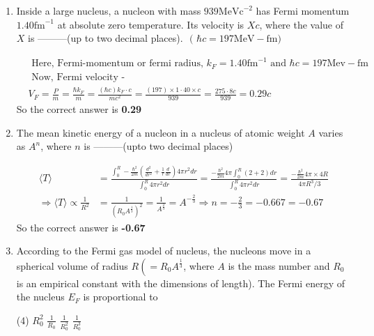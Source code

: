 \begin{enumerate}
	\item  Inside a large nucleus, a nucleon with mass $939 \mathrm{MeVc}^{-2}$ has Fermi momentum $1.40 \mathrm{fm}^{-1}$ at absolute zero temperature. Its velocity is $X c$, where the value of $X$ is ---------(up to two decimal places).
	$
	\text { ( } \hbar c=197 \mathrm{MeV}-\mathrm{fm})
	$
	\begin{answer}
		\begin{align*}
	&\text{ Here, Fermi-momentum or fermi radius, $k_F=1.40 \mathrm{fm}^{-1}$ and $\hbar c=197 \mathrm{Mev}-\mathrm{fm}$ }\\
&\text{	Now, Fermi velocity -}\\
	&	V_F=\frac{P}{m}=\frac{\hbar k_F}{m}=\frac{(\hbar c) k_F \cdot c}{m c^2}=\frac{(197) \times 1 \cdot 40 \times c}{939}=\frac{275 \cdot 8 c}{939}=0.29 c
		\end{align*}
		So the correct answer is \textbf{0.29}
	\end{answer}
	\item  The mean kinetic energy of a nucleon in a nucleus of atomic weight $A$ varies as $A^n$, where $n$ is ---------(upto two decimal places)
	\begin{answer}
		\begin{align*}
		\langle T\rangle&=\frac{\int_0^R-\frac{\hbar^2}{2 m}\left(\frac{d^2}{d r^2}+\frac{1}{r} \frac{d}{d r}\right) 4 \pi r^2 d r}{\int_0^R 4 \pi r^2 d r}=\frac{-\frac{\hbar^2}{2 m} 4 \pi \int_0^R(2+2) d r}{\int_0^R 4 \pi r^2 d r}=\frac{-\frac{\hbar^2}{2 m} 4 \pi \times 4 R}{4 \pi R^3 / 3}\\
		\Rightarrow\langle T\rangle \propto \frac{1}{R^2}&=\frac{1}{\left(R_0 A^{\frac{1}{3}}\right)^2}=\frac{1}{A^{\frac{2}{3}}}=A^{-\frac{2}{3}} \Rightarrow n=-\frac{2}{3}=-0.667=-0.67
		\end{align*}
			So the correct answer is \textbf{-0.67}
	\end{answer}
	\item  According to the Fermi gas model of nucleus, the nucleons move in a spherical volume of radius $R\left(=R_0 A^{\frac{1}{3}}\right.$, where $A$ is the mass number and $R_0$ is an empirical constant with the dimensions of length). The Fermi energy of the nucleus $E_F$ is proportional to
	\begin{tasks}(4)
		\task[\textbf{a.}]$R_0^2$
		\task[\textbf{b.}]$\frac{1}{R_0}$
		\task[\textbf{c.}]$\frac{1}{R_0^2}$
		\task[\textbf{d.}] $\frac{1}{R_0^3}$
	\end{tasks}
\begin{answer}

\end{answer}
\end{enumerate}
